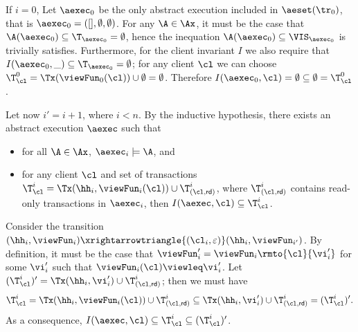 If $i = 0$, Let $\aexec_{0}$ be the only abstract execution included in $\aeset(\tr_{0})$, 
that is $\aexec_{0} = ([], \emptyset, \emptyset)$. For any $\A \in \Ax$, it must be the case that 
$\A(\aexec_{0}) \subseteq \T_{\aexec_{0}} = \emptyset$, hence the inequation $\A(\aexec_{0}) \subseteq \VIS_{\aexec_{0}}$ 
is trivially satisfies. Furthermore, for the client invariant $I$ we also require that $I(\aexec_{0}, \_) \subseteq \T_{\aexec_{0}} = \emptyset$; 
for any client $\cl$ we can choose $\T_{\cl}^{0} = \Tx(\viewFun_{0}(\cl)) \cup \emptyset = \emptyset$. Therefore 
$I(\aexec_{0}, \cl) = \emptyset \subseteq \emptyset = \T_{\cl}^{0}$.

Let now $i' = i + 1$, where $i < n$.
By the inductive hypothesis, there exists an abstract execution $\aexec$ such that  
\begin{itemize}
\item for all $\A \in \Ax$, $\aexec_{i} \models \A$, and 
\item for any client $\cl$ and set of transactions $\T_{\cl}^{i} = \Tx(\hh_{i}, \viewFun_{i}(\cl)) \cup \T_{(\cl, \mathsf{rd})}^{i}$, 
where $\T_{(\cl, \mathsf{rd})}^{i}$ contains read-only transactions in $\aexec_{i}$,
then $I(\aexec, \cl) \subseteq \T_{\cl}^{i}$.
\end{itemize}
Consider the transition $(\hh_{i}, \viewFun_{i}) \xrightarrowtriangle{(\cl_{i}, \varepsilon)} (\hh_{i}, \viewFun_{i'})$. 
By definition, it must be the case that $\viewFun'_{i} = \viewFun_{i}\rmto{\cl}{\vi'_{i}}$ 
for some $\vi'_{i}$ such that $\viewFun_{i}(\cl) \viewleq \vi'_{i}$.
Let $(\T_{\cl}^{i})' = \Tx(\hh_{i}, \vi'_{i}) \cup \T_{(\cl, \mathsf{rd})}^{i}$; then we must have 
\[
\T_{\cl}^{i} = \Tx(\hh_{i}, \viewFun_{i}(\cl)) \cup  \T_{(\cl, \mathsf{rd})}^{i} \subseteq \Tx(\hh_{i}, \vi'_{i}) \cup \T_{(\cl, \mathsf{rd})}^{i}= (\T_{\cl}^{i})'. 
\]
As a consequence, $I(\aexec, \cl) \subseteq \T_{\cl}^{i} \subseteq (\T_{\cl}^{i})'$.

